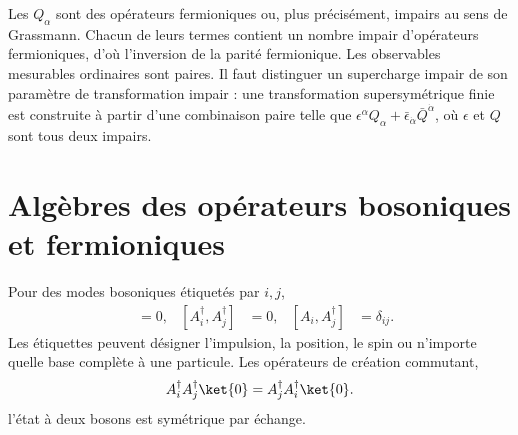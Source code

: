 \begin{classroomqa}
\end{classroomqa}

Les \(Q_\alpha\) sont des opérateurs fermioniques ou, plus précisément, impairs au sens de Grassmann. Chacun de leurs termes contient un nombre impair d’opérateurs fermioniques, d’où l’inversion de la parité fermionique. Les observables mesurables ordinaires sont paires. Il faut distinguer un supercharge impair de son paramètre de transformation impair : une transformation supersymétrique finie est construite à partir d’une combinaison paire telle que \(\epsilon^\alpha Q_\alpha+\bar\epsilon_{\dot\alpha}\bar Q^{\dot\alpha}\), où \(\epsilon\) et \(Q\) sont tous deux impairs. 

\section{Algèbres des opérateurs bosoniques et fermioniques}

Pour des modes bosoniques étiquetés par \(i,j\),
\begin{align}
[A_i,A_j]&=0,&
[A_i^\dagger,A_j^\dagger]&=0,&
[A_i,A_j^\dagger]&=\delta_{ij}.
\end{align}
Les étiquettes peuvent désigner l’impulsion, la position, le spin ou n’importe quelle base complète à une particule. Les opérateurs de création commutant,
\begin{equation}
A_i^\dagger A_j^\dagger\ket{0}
=A_j^\dagger A_i^\dagger\ket{0}.
\end{equation}
l’état à deux bosons est symétrique par échange.

